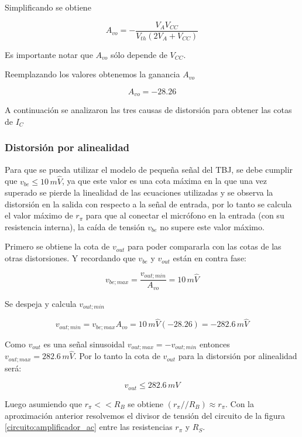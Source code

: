\documentclass[10pt,spanish,a4paper,openany,notitlepage]{article}
\begin{document}
Simplificando se obtiene

\begin{equation}
\displaystyle A_{vo} = -\frac{V_A V_{CC}}{V_{th} (2 V_A + V_{CC})}
\label{eq:Avo}
\end{equation}

Es importante notar que $A_{vo}$ sólo depende de $V_{CC}$.

Reemplazando los valores obtenemos la ganancia $A_{vo}$

\[ \displaystyle A_{vo} = -28.26 \]

A continuación se analizaron las tres causas de distorsión para obtener las
cotas de $I_C$

\subsubsection{Distorsión por alinealidad}

Para que se pueda utilizar el modelo de pequeña señal del TBJ, se
debe cumplir que $v_{be} \leqslant 10\,\unit{m\widehat{V}}$, ya que este valor es una 
cota máxima en la que una vez superado se pierde la linealidad de las 
ecuaciones utilizadas y se observa la distorsión en la salida con 
respecto a la señal de entrada, por lo tanto se calcula el valor  
máximo de $r_{\pi}$ para que al conectar el micrófono en la entrada 
(con su resistencia interna), la caída de tensión $v_{be}$ no supere este valor 
máximo.

Primero se obtiene la cota de $v_{out}$ para poder compararla con las
cotas de las otras distorsiones. Y recordando que $v_{be}$ y $v_{out}$
están en contra fase:

\[ \displaystyle v_{be;max} = \frac{v_{out;min}}{A_{vo}} = 10\,\unit{m\widehat{V}}\]

Se despeja y calcula $v_{out;min}$

\[ \displaystyle v_{out;min} = v_{be;max} A_{vo} = 10\,\unit{m\widehat{V}} (-28.26) = -282.6 \,\unit{m\widehat{V}}\]

Como $v_{out}$ es una señal sinusoidal $v_{out;max} = -v_{out;min}$ entonces
$v_{out;max} = 282.6 \,\unit{m\widehat{V}}$. 
Por lo tanto la cota de $v_{out}$ para la distorsión por alinealidad será:

\begin{equation}
v_{out} \leqslant 282.6\, \unit{mV}
\label{eq:vout_alinealidad}
\end{equation}


Luego asumiendo que $r_\pi << R_B$ se obtiene $(r_\pi // R_B) \approx r_\pi$.
Con la aproximación anterior resolvemos el divisor de tensión del circuito
de la figura \ref{circuito:amplificador_ac} entre las resistencias $r_\pi$
y $R_S$.
\end{document}
